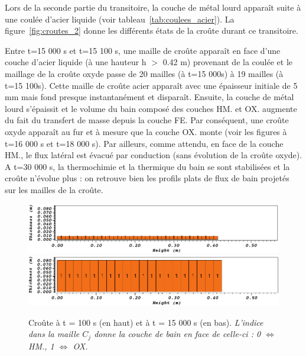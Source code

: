 Lors de la seconde partie du transitoire, la couche de métal lourd apparaît suite à une coulée d'acier liquide (voir tableau~\ref{tab:coulees_acier}). La figure~\ref{fig:croutes_2} donne les différents états de la croûte durant ce transitoire.

Entre t=15 000 s et t=15 100 s, une maille de croûte apparaît en face d'une couche d'acier liquide (à une hauteur h $>$ 0.42 m) provenant de la coulée et le maillage de la croûte oxyde passe de 20 mailles (à t=15 000s) à 19 mailles (à t=15 100s). Cette maille de croûte acier apparaît avec une épaisseur initiale de 5 mm mais fond presque instantanément et disparaît. Ensuite, la couche de métal lourd s'épaissit et le volume du bain composé des couches HM. et OX. augmente du fait du transfert de masse depuis la couche FE. Par conséquent, une croûte oxyde apparaît au fur et à mesure que la couche OX. monte (voir les figures à t=16 000 s et t=18 000 s). Par ailleurs, comme attendu, en face de la couche HM., le flux latéral est évacué par conduction (sans évolution de la croûte oxyde). A t=30 000 s, la thermochimie et la thermique du bain se sont stabilisées et la croûte n'évolue plus : on retrouve bien les profils plats de flux de bain projetés sur les mailles de la croûte.

\begin{figure}[H]
\centering
\includegraphics[width=\textwidth, keepaspectratio=true]{Figures/croute_100.png}\\
\includegraphics[width=\textwidth, keepaspectratio=true]{Figures/croute_15000.png}
\caption{Croûte à t = 100 s (en haut) et à t = 15 000 s (en bas). \textit{L'indice dans la maille $C_j$ donne la couche de bain en face de celle-ci : 0 $\Leftrightarrow$ HM., 1 $\Leftrightarrow$ OX.}}
\label{fig:croutes_1}
\end{figure}

